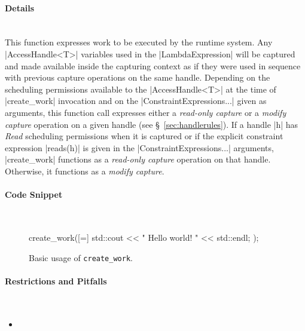 \paragraph{Details}\mbox{}\\
This function expresses work to be executed by the runtime system.  Any
|AccessHandle<T>| variables used in the |LambdaExpression| will be
captured and made available inside the capturing context as if they were used in
sequence with previous capture operations on the same handle.  Depending on the
scheduling permissions available to the |AccessHandle<T>| at the time of
|create_work| invocation and on the |ConstraintExpressions...|
given as arguments, this function call expresses either a {\it read-only
capture} or a {\it modify capture} operation on a given handle (see
\S~\ref{sec:handlerules}).  If a handle |h| has {\it Read} scheduling
permissions when it is captured or if the explicit constraint expression
|reads(h)| is given in the |ConstraintExpressions...| arguments,
|create_work| functions as a {\it read-only capture} operation on that handle.
Otherwise, it functions as a {\it modify capture}.  


\paragraph{Code Snippet}\mbox{}\\
\begin{figure}[!h]
\begin{CppCodeNumb}
create_work([=]{
  std::cout << " Hello world! " << std::endl;
});
\end{CppCodeNumb}
\label{fig:fe_api_cw}
\caption{Basic usage of \texttt{create\_work}.}
\end{figure}


\paragraph{Restrictions and Pitfalls}\mbox{} \\
\begin{itemize}
  \item {}
\end{itemize}

